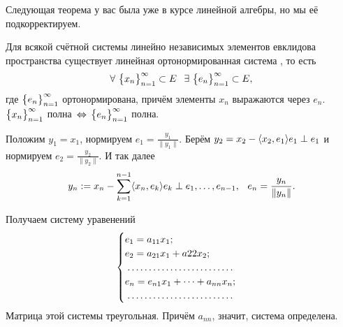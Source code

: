 Следующая теорема у вас была уже в курсе линейной алгебры, но мы её подкорректируем.
\begin{The}
	Для всякой счётной системы линейно независимых элементов евклидова пространства существует линейная ортонормированная система , то есть
	\[
		\forall\ \pos x\subset E\pau\exists\ \pos e\subset E,
	\]
	где $\big\{{e}_{n}\big\}_{n=1}^\infty$ ортонормирована, причём элементы $x_n$ выражаются через $e_n$. $\big\{{x}_{n}\big\}_{n=1}^\infty$ полна $\,\Leftrightarrow\, \big\{{e}_{n}\big\}_{n=1}^\infty$ полна.
\end{The}
\begin{Proof}
	Положим $y_1 = x_1$, нормируем $e_1 = \frac{y_1}{\|y_1\|}$.
	Берём $y_2 = x_2 - \langle x_2,e_1\rangle e_1\perp e_1$ и нормируем $e_2 = \frac{y_2}{\|y_2\|}$.
	И так далее
\[
	y_n:=x_n - \sum\limits_{k = 1}^{n-1}\langle x_n,e_k\rangle e_k\perp e_1,\dots,e_{n-1},\hskip .75em plus.1em minus.08em\relax e_n = \frac{y_n}{\|y_n\|}.
\]

Получаем систему уравенений
\[
	\begin{cases}
		e_1 = a_{11} x_1; \\
		e_2 = a_{21} x_1 + a22 x_2;\\
		\dotfill\\
		e_n = e_{n1} x_1 +\dots+a_{nn}x_n;\\
		\dotfill
	\end{cases}
\]
Матрица этой системы треугольная.
Причём $a_{nn}$, значит, система определена.
\end{Proof}

